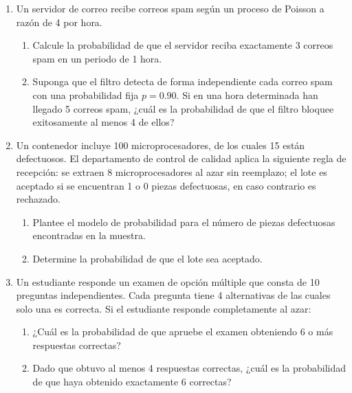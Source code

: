 \documentclass[letterpaper,12pt,spanish]{article}
\begin{document}
\begin{enumerate}[label=\textbf{\arabic*.}]
    \vspace{0.3cm}

    \item Un servidor de correo recibe correos spam según un proceso de Poisson a razón de 4 por hora. 
    \begin{enumerate}[label=\alph*)]
        \item Calcule la probabilidad de que el servidor reciba exactamente 3 correos spam en un periodo de 1 hora.
        \item Suponga que el filtro detecta de forma independiente cada correo spam con una probabilidad fija $p = 0.90$. Si en una hora determinada han llegado 5 correos spam, ¿cuál es la probabilidad de que el filtro bloquee exitosamente al menos 4 de ellos?
    \end{enumerate}

    \vspace{0.3cm}

    \item Un contenedor incluye 100 microprocesadores, de los cuales 15 están defectuosos. El departamento de control de calidad aplica la siguiente regla de recepción: se extraen 8 microprocesadores al azar sin reemplazo; el lote es aceptado si se encuentran 1 o 0 piezas defectuosas, en caso contrario es rechazado.
    \begin{enumerate}[label=\alph*)]
        \item Plantee el modelo de probabilidad para el número de piezas defectuosas encontradas en la muestra.
        \item Determine la probabilidad de que el lote sea aceptado.
    \end{enumerate}

    \vspace{0.3cm}

    \item Un estudiante responde un examen de opción múltiple que consta de 10 preguntas independientes. Cada pregunta tiene 4 alternativas de las cuales solo una es correcta. Si el estudiante responde completamente al azar:
    \begin{enumerate}[label=\alph*)]
        \item ¿Cuál es la probabilidad de que apruebe el examen obteniendo 6 o más respuestas correctas?
        \item Dado que obtuvo al menos 4 respuestas correctas, ¿cuál es la probabilidad de que haya obtenido exactamente 6 correctas?
    \end{enumerate}


\end{enumerate}
\end{document}

